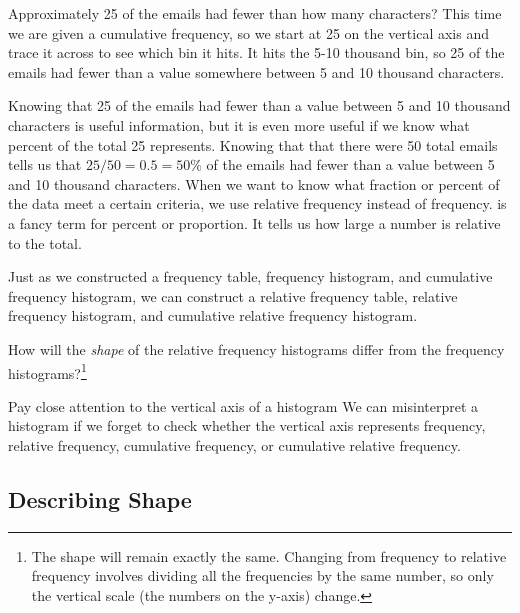 \begin{example}{Approximately 25 of the emails had fewer than how many characters?}
This time we are given a cumulative frequency, so we start at 25 on the vertical axis and trace it across to see which bin it hits. It hits the 5-10 thousand bin, so 25 of the emails had fewer than a value somewhere between 5 and 10 thousand characters.
\end{example}

Knowing that 25 of the emails had fewer than a value between 5 and 10 thousand characters is useful information, but it is even more useful if we know what percent of the total 25 represents. Knowing that that there were 50 total emails tells us that $25 / 50 = 0.5 = 50\%$ of the emails had fewer than a value between 5 and 10 thousand characters. When we want to know what fraction or percent of the data meet a certain criteria, we use relative frequency instead of frequency.  is a fancy term for percent or proportion. It tells us how large a number is relative to the total.

Just as we constructed a frequency table, frequency histogram, and cumulative frequency histogram, we can construct a relative frequency table, relative frequency histogram, and cumulative relative frequency histogram.

\begin{exercise}
How will the \emph{shape} of the relative frequency histograms differ from the frequency histograms?\footnote{The shape will remain exactly the same. Changing from frequency to relative frequency involves dividing all the frequencies by the same number, so only the vertical scale (the numbers on the y-axis) change.}
\end{exercise}

\begin{caution}{Pay close attention to the vertical axis of a histogram}
{We can misinterpret a histogram if we forget to check whether the vertical axis represents frequency, relative frequency, cumulative frequency, or cumulative relative frequency.}
\end{caution}




\subsection{Describing Shape}
\label{shape}


